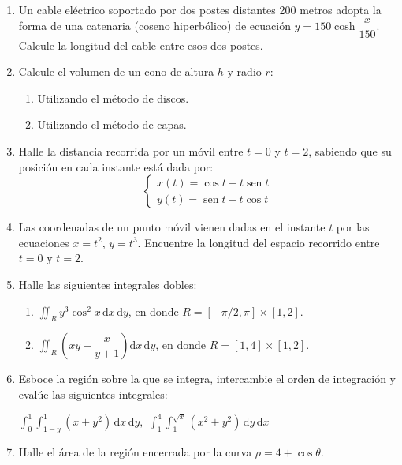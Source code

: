 \begin{enumerate}
\item Un cable eléctrico soportado por dos postes distantes 200 metros adopta la forma de una catenaria (coseno hiperbólico) de ecuación $y=150\cosh\dfrac{x}{150}$. Calcule la longitud del cable entre esos dos postes.

\item
Calcule el volumen de un cono de altura $h$ y radio $r$:
\begin{enumerate}
\item Utilizando el método de discos.
\item Utilizando el método de capas.
\end{enumerate}

\item Halle la distancia recorrida por un móvil entre $t=0$ y $t=2$, sabiendo que su posición en cada instante está dada por: 
$$\left\lbrace\begin{array}{l}
x(t)=\cos t+t\operatorname{sen} t\\
y(t)=\operatorname{sen} t-t\cos t
\end{array}\right.$$

\item
Las coordenadas de un punto móvil vienen dadas en el instante $t$ por las ecuaciones $x=t^2$, $y=t^3$. Encuentre la longitud del espacio recorrido entre $t=0$ y $t=2$.

\item Halle las siguientes integrales dobles:
\begin{enumerate}
\item
$\displaystyle\iint\nolimits_{R} y^3 \cos^2 x\,\mathrm dx\,\mathrm dy$, en donde $R=[-\pi/2,\pi]\times [1,2]$.
\item
$\displaystyle\iint\nolimits_{R} \left(xy+\dfrac{x}{y+1}\right)\mathrm dx\,\mathrm dy$, en donde $R=[1,4]\times [1,2]$.
\end{enumerate}

\item
Esboce la región sobre la que se integra, intercambie el orden de
integración y evalúe las siguientes integrales:
\setcontadoralph
\begin{centrar}
\nitem $\displaystyle\int_0^1\int_{1-y}^{1} (x +y^2)\,\mathrm dx\,\mathrm dy,$\hfill
\nitem $\displaystyle\int_1^4\int_1^{\sqrt{x}} (x^2 +y^2)\,\mathrm dy\,\mathrm dx$
\end{centrar}

\item Halle el área de la región encerrada por la curva $\rho=4+\cos\theta$.


\end{enumerate}
